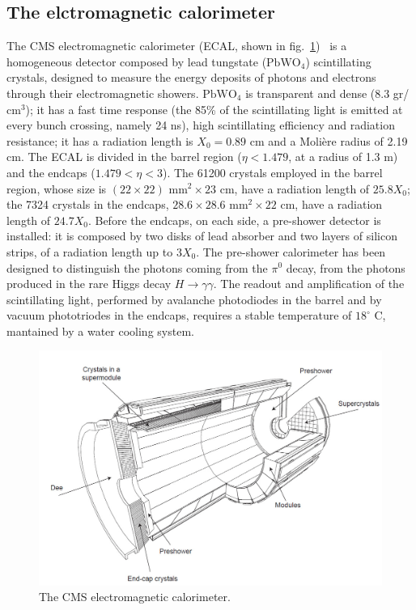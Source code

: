\subsection{The elctromagnetic calorimeter}
The CMS electromagnetic calorimeter (ECAL, shown in fig.~\ref{fig:CMS_ecal})~\cite{ECAL-TDR} is a homogeneous detector composed by lead tungstate ($\text{PbWO}_4$) scintillating crystals, designed to measure the energy deposits of photons and electrons through their electromagnetic showers. $\text{PbWO}_4$ is transparent and dense (8.3 gr/$\text{cm}^3$); it has a fast time response (the 85\% of the scintillating light is emitted at every bunch crossing, namely 24 ns), high scintillating efficiency and radiation resistance; it has a radiation length is $X_0 = 0.89$ cm and a Moli\`ere radius of 2.19 cm. The ECAL is divided in the barrel region ($\eta < 1.479$, at a radius of 1.3 m) and the endcaps ($1.479 < \eta < 3$).  The 61200 crystals employed in the barrel region, whose size is $(22 \times 22) \text{ mm}^2 \times 23 \text{ cm}$, have a radiation length of $25.8 X_0$; the 7324 crystals in the endcaps, $ 28.6 \times 28.6 \text{ mm}^2 \times 22 \text{ cm}$, have a radiation length of $24.7 X_0$. Before the endcaps, on each side, a pre-shower detector is installed: it is composed by two disks of lead absorber and two layers of silicon strips, of a radiation length up to $3X_0$. The pre-shower calorimeter has been designed to distinguish the photons coming from the $\pi^0$ decay, from the photons produced in the rare Higgs decay $H \rightarrow \gamma \gamma$. The readout and amplification of the scintillating light, performed by avalanche photodiodes in the barrel and by vacuum phototriodes in the endcaps, requires a stable temperature of $18^{\circ}$ C, mantained by a water cooling system.

\begin{figure}[!htb]
  \centering
    \includegraphics[width=.7\textwidth]{figures/cmsecal.png}
  \caption{The CMS electromagnetic calorimeter.}
  \label{fig:CMS_ecal}
\end{figure}


